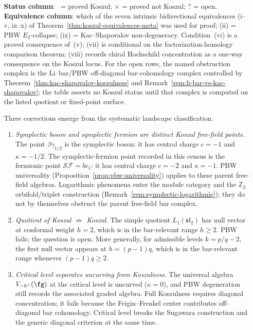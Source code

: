 \noindent
\textbf{Status column}: \checkmark\ = proved Koszul;
$\boldsymbol{\times}$ = proved not Koszul; ? = open.
\textbf{Equivalence column}: which of the seven intrinsic
bidirectional equivalences
\textup{(}i--v, ix--x\textup{)} of
Theorem~\ref{thm:koszul-equivalences-meta} was used for proof;
(ii) = PBW $E_2$-collapse;
(ix) = Kac--Shapovalov non-degeneracy. Condition~(vi) is a proved
consequence of~(v); (vii) is conditional on the factorization-homology
comparison theorem; (viii) records chiral Hochschild concentration
as a one-way consequence on the Koszul locus.
For the open rows, the named obstruction complex is the
Li--bar/PBW off-diagonal bar-cohomology complex controlled by
Theorem~\ref{thm:kac-shapovalov-koszulness} and
Remark~\ref{rem:li-bar-vs-kac-shapovalov}; the table asserts no
Koszul status until that complex is computed on the listed quotient
or fixed-point surface.

\begin{remark}
\label{rem:koszulness-corrections}
Three corrections emerge from the systematic landscape classification.
\begin{enumerate}
\item \emph{Symplectic boson and symplectic fermion are distinct
Koszul free-field points.}
 The point $\beta\gamma_{1/2}$ is the symplectic boson: it has
 central charge $c=-1$ and $\kappa=-1/2$. The symplectic-fermion point
 recorded in this census is the fermionic point $\mathcal{SF}=bc_1$:
 it has central charge $c=-2$ and $\kappa=-1$. PBW universality
 (Proposition~\ref{prop:pbw-universality}) applies to these parent
 free-field algebras. Logarithmic phenomena enter the module category
 and the $\mathbb{Z}_2$ orbifold/triplet construction
 (Remark~\ref{rem:symplectic-logarithmic}); they do not by themselves
 obstruct the parent free-field bar complex.
\item \emph{Quotient of Koszul $\not\Rightarrow$ Koszul.}
 The simple quotient $L_1(\mathfrak{sl}_2)$ has null vector at
 conformal weight $h = 2$, which is in the bar-relevant range
 $h \geq 2$. PBW fails; the question is open. More generally, for
 admissible levels $k = p/q - 2$, the first null vector appears at
 $h = (p{-}1)q$, which is in the bar-relevant range whenever
 $(p{-}1)q \geq 2$.
\item \emph{Critical level separates uncurving from Koszulness.}
 The universal algebra $V_{-h^\vee}(\fg)$ at the critical level
 is uncurved ($\kappa = 0$), and PBW degeneration still records the
 associated graded algebra. Full Koszulness requires diagonal
 concentration; it fails because the Feigin--Frenkel center contributes
 off-diagonal bar cohomology. Critical level breaks the Sugawara
 construction and the generic diagonal criterion at the same time.
\end{enumerate}
\end{remark}

